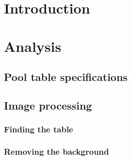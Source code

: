 
\usepackage{float}
\usepackage{graphicx}







\tableofcontents

\chapter{Introduction}

\chapter{Analysis}
	\section{Pool table specifications}
		

	
\section{Image processing}
	\subsection{Finding the table}
		

	\subsection{Removing the background}
		




